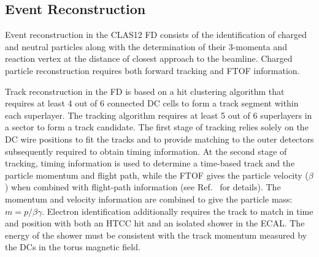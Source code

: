 \documentclass[final,3p,twocolumn]{elsarticle}
\begin{document}
\begin{figure}[htbp!]
\label{gemc-event}
\end{figure}
\subsection{Event Reconstruction} 

Event reconstruction in the CLAS12 FD consists of the identification of charged and neutral particles along with the 
determination of their 3-momenta and reaction vertex at the distance of closest approach to the beamline.
Charged particle reconstruction requires both forward tracking and FTOF information. 

Track reconstruction in the FD is based on a hit clustering algorithm that requires at least 4 out of 6 connected DC
cells to form a track segment within each superlayer.  The tracking algorithm requires at least 5 out of 6 superlayers
in a sector to form a track candidate. The first stage of tracking relies solely on the DC wire positions to fit the
tracks and to provide matching to the outer detectors subsequently required to obtain timing information. At the
second stage of tracking, timing information is used to determine a time-based track and the particle momentum
and flight path, while the FTOF gives the particle velocity ($\beta$) when combined with flight-path information
(see Ref.~\cite{Software} for details). The momentum and velocity information are combined to give the particle
mass: $m = p/\beta\gamma$. Electron identification additionally requires the track to match in time and position
with both an HTCC hit and an isolated shower in the ECAL. The energy of the shower must be consistent with the
track momentum measured by the DCs in the torus magnetic field. 
\end{document}
